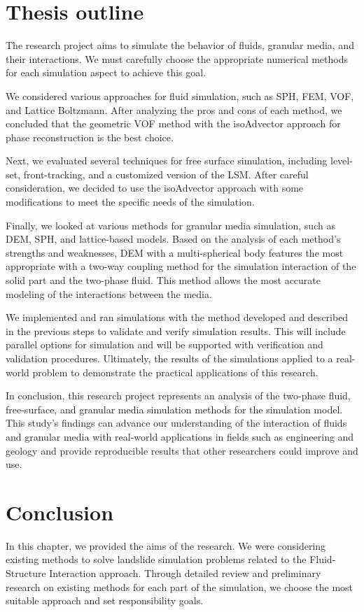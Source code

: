 \section{Thesis outline}

The research project aims to simulate the behavior of fluids, granular media, and their interactions. We must carefully choose the appropriate numerical methods for each simulation aspect to achieve this goal.

We considered various approaches for fluid simulation, such as SPH, FEM, VOF, and Lattice Boltzmann. After analyzing the pros and cons of each method, we concluded that the geometric VOF method with the isoAdvector approach for phase reconstruction is the best choice.

Next, we evaluated several techniques for free surface simulation, including level-set, front-tracking, and a customized version of the LSM. After careful consideration, we decided to use the isoAdvector approach with some modifications to meet the specific needs of the simulation.

Finally, we looked at various methods for granular media simulation, such as DEM, SPH, and lattice-based models. Based on the analysis of each method's strengths and weaknesses, DEM with a multi-spherical body features the most appropriate with a two-way coupling method for the simulation interaction of the solid part and the two-phase fluid. This method allows the most accurate modeling of the interactions between the media.

We implemented and ran simulations with the method developed and described in the previous steps to validate and verify simulation results. This will include parallel options for simulation and will be supported with verification and validation procedures.
Ultimately, the results of the simulations applied to a real-world problem to demonstrate the practical applications of this research.

In conclusion, this research project represents an analysis of the two-phase fluid, free-surface, and granular media simulation methods for the simulation model. This study's findings can advance our understanding of the interaction of fluids and granular media with real-world applications in fields such as engineering and geology and provide reproducible results that other researchers could improve and use.

\section{Conclusion}

In this chapter, we provided the aims of the research. We were considering existing methods to solve landslide simulation problems related to the Fluid-Structure Interaction approach. Through detailed review and preliminary research on existing methods for each part of the simulation, we choose the most suitable approach and set responsibility goals. 